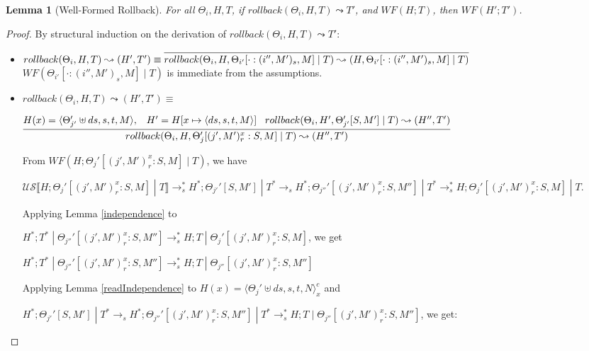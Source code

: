 \documentclass[9pt]{article}
\newtheorem{lemma}{Lemma}
\newcommand\specStep{\rightarrow_{s}}
\newcommand{\unSpec}[1]{\mathcal{US} \llbracket #1 \rrbracket}
\begin{document}
\begin{lemma}[Well-Formed Rollback]
\label{wellFormedRollback}
For all $\Theta_i, H, T$, if $rollback(\Theta_i, H, T) \leadsto T'$, and $WF(H; T)$, then $WF(H'; T')$. 
\end{lemma}

\begin{proof}
By structural induction on the derivation of $rollback(\Theta_i, H, T) \leadsto T'$:

\begin{itemize}
\item $rollback(\Theta_i, H, T) \leadsto (H',T') \equiv \infer[]{rollback(\Theta_i, H, \Theta_{i'}[\cdot : (i'', M')_s, M] \; | \; T) \leadsto (H, \Theta_{i'}[\cdot : (i'', M')_s, M] \; | \; T)}{}$
$WF(\Theta_{i'}[\cdot : (i'', M')_s, M] \; | \; T)$ is immediate from the assumptions. 

\item $rollback(\Theta_i, H, T ) \leadsto (H', T') \equiv$

$ \infer[]{rollback(\Theta_i, H, \Theta_j'[(j', M')_r^x : S, M] \; | \; T) \leadsto (H'', T')}{H(x) = \langle  \Theta_{j'}' \uplus ds, s, t, M\rangle, \;\;\; H' = H[x \mapsto \langle  ds, s, t, M\rangle] \;\;\; rollback(\Theta_i, H', \Theta_{j'}'[S, M'] \; | \; T) \leadsto (H'', T')}$

From $WF(H; \Theta_j'[(j', M')_r^x : S, M] \; | \; T)$, we have 

$\unSpec{H; \Theta_j'[ (j', M')_r^x : S, M] \; | \; T} \specStep^* H^*; \Theta_{j'}'[S, M'] \; | \; T^* \specStep H^*; \Theta_{j''}'[ (j', M')_r^x : S, M''] \; | \; T^* \specStep^* H; \Theta_j'[(j', M')_r^x : S, M] \; | \; T$.  

Applying Lemma \ref{independence} to 

$H^*; T^* \; | \; \Theta_{j''}'[(j', M')_r^x : S, M'']  \specStep^* H; T \; | \; \Theta_j'[(j', M')_r^x : S, M] $, we get

$H^*; T^* \; | \; \Theta_{j''}'[(j', M')_r^x : S, M'']  \specStep^* H; T \; | \; \Theta_{j''}[ (j', M')_r^x : S, M'']  $

Applying Lemma \ref{readIndependence} to $H(x) = \langle \Theta_j' \uplus ds, s, t, N\rangle_x^c$ and 

$H^*; \Theta_{j'}'[S, M'] \; | \; T^* \specStep H^*; \Theta_{j''}'[(j', M')_r^x : S, M''] \; | \; T^* \specStep^*  H; T \; | \; \Theta_{j''}[ (j', M')_r^x : S, M'']$, we get:


\end{itemize}
\end{proof}
\end{document}
